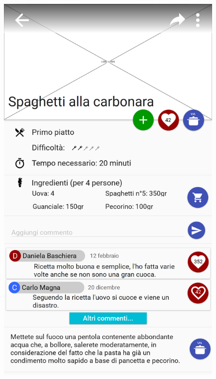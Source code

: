 \begin{figure}[H]
\begin{minipage}{.49\textwidth}
		\includegraphics[width=\textwidth]{img/wireframe/presentazione_ricetta.png}
	\end{minipage}
\end{figure}

